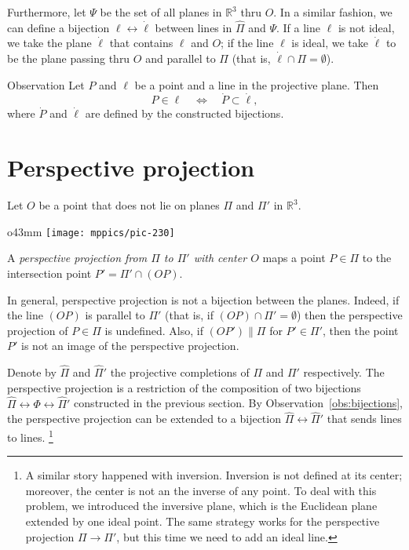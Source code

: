 Furthermore, let $\Psi$ be the set of all planes in $\mathbb{R}^3$ thru $O$.
In a similar fashion, we can define a bijection $\ell\leftrightarrow \dot \ell$ between lines in $\hat \Pi$ and $\Psi$.
If a line $\ell$ is not ideal, we take the plane $\dot \ell$ that contains $\ell$ and $O$;
if the line $\ell$ is ideal, we take $\dot \ell$ to be the plane passing thru $O$ and parallel to $\Pi$ (that is, $\dot\ell\cap\Pi=\emptyset$).

\begin{thm}{Observation}\label{obs:bijections}
Let $P$ and $\ell$ be a point and a line in the projective plane.
Then 
\[P\in \ell \quad\iff\quad \dot P\subset \dot \ell,\]
where $\dot P$ and $\dot \ell$ are defined by the constructed bijections.
\end{thm}

\section{Perspective projection}
\label{sec:perspective-projection}

Let $O$ be a point that does not lie on planes $\Pi$ and $\Pi'$ in $\mathbb{R}^3$.

\begin{wrapfigure}{o}{43mm}
\centering
\vskip-4mm
\texttt{[image: mppics/pic-230]}
\end{wrapfigure}

A \emph{perspective projection from $\Pi$ to $\Pi'$ with center $O$} maps a point $P\in \Pi$
to the intersection point $P'=\Pi'\cap (OP)$.

In general, perspective projection is not a bijection between the planes.
Indeed, if the line $(OP)$ is parallel to $\Pi'$ 
(that is, if $(OP)\cap\Pi'=\emptyset$)
then the perspective projection of $P\in \Pi$ is undefined.
Also, if $(OP')\parallel \Pi$ 
for $P'\in \Pi'$,
then the point $P'$ is not an image of the perspective projection.

Denote by $\hat \Pi$ and $\hat \Pi'$ the projective completions of $\Pi$ and $\Pi'$ respectively. 
The perspective projection is a restriction of the composition of two bijections $\hat \Pi\leftrightarrow\Phi \leftrightarrow\hat \Pi'$ constructed in the previous section.
By Observation~\ref{obs:bijections}, the perspective projection can be extended to a bijection $\hat \Pi\leftrightarrow\hat \Pi'$ that sends lines to lines.%
\footnote{A similar story happened with inversion.
Inversion is not defined at its center;
moreover, the center is not an the inverse of any point.
To deal with this problem, we introduced the inversive plane, 
which is the Euclidean plane extended by one ideal point.
The same strategy works for the perspective projection $\Pi\to\Pi'$, but this time we need to add an ideal line.}

